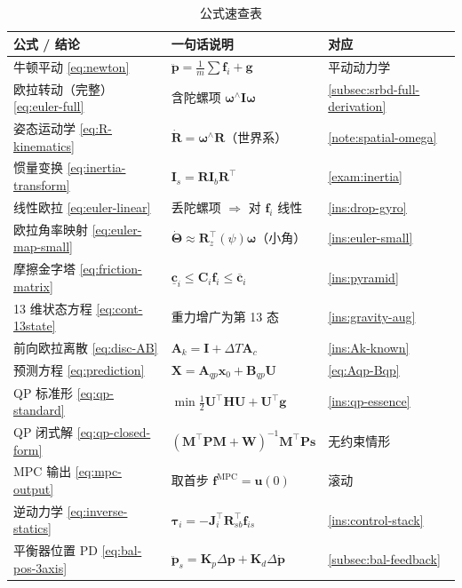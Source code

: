 \begin{table}[H]\centering\small
\caption{公式速查表}
\begin{tabular}{lll}
\toprule
公式 / 结论 & 一句话说明 & 对应 \\
\midrule
牛顿平动 \cref{eq:newton} & $\ddot{\boldsymbol{p}}=\tfrac1m\sum\mathbf{f}_i+\boldsymbol{g}$ & 平动动力学 \\
欧拉转动（完整）\cref{eq:euler-full} & 含陀螺项 $\boldsymbol{\omega}^\wedge\mathbf{I}\boldsymbol{\omega}$ & \cref{subsec:srbd-full-derivation} \\
姿态运动学 \cref{eq:R-kinematics} & $\dot{\mathbf{R}}=\boldsymbol{\omega}^\wedge\mathbf{R}$（世界系） & \cref{note:spatial-omega} \\
惯量变换 \cref{eq:inertia-transform} & $\mathbf{I}_s=\mathbf{R}\mathbf{I}_b\mathbf{R}^\top$ & \cref{exam:inertia} \\
线性欧拉 \cref{eq:euler-linear} & 丢陀螺项 $\Rightarrow$ 对 $\mathbf{f}_i$ 线性 & \cref{ins:drop-gyro} \\
欧拉角率映射 \cref{eq:euler-map-small} & $\dot{\boldsymbol{\Theta}}\approx\mathbf{R}_z^\top(\psi)\boldsymbol{\omega}$（小角） & \cref{ins:euler-small} \\
摩擦金字塔 \cref{eq:friction-matrix} & $\underline{\mathbf{c}}_i\le\mathbf{C}_i\mathbf{f}_i\le\overline{\mathbf{c}}_i$ & \cref{ins:pyramid} \\
13 维状态方程 \cref{eq:cont-13state} & 重力增广为第 13 态 & \cref{ins:gravity-aug} \\
前向欧拉离散 \cref{eq:disc-AB} & $\mathbf{A}_k=\mathbf{I}+\Delta T\mathbf{A}_c$ & \cref{ins:Ak-known} \\
预测方程 \cref{eq:prediction} & $\mathbf{X}=\mathbf{A}_{qp}\boldsymbol{x}_0+\mathbf{B}_{qp}\mathbf{U}$ & \cref{eq:Aqp-Bqp} \\
QP 标准形 \cref{eq:qp-standard} & $\min\tfrac12\mathbf{U}^\top\mathbf{H}\mathbf{U}+\mathbf{U}^\top\mathbf{g}$ & \cref{ins:qp-essence} \\
QP 闭式解 \cref{eq:qp-closed-form} & $(\mathbf{M}^\top\mathbf{P}\mathbf{M}+\mathbf{W})^{-1}\mathbf{M}^\top\mathbf{P}\mathbf{s}$ & 无约束情形 \\
MPC 输出 \cref{eq:mpc-output} & 取首步 $\mathbf{f}^{\mathrm{MPC}}=\boldsymbol{u}(0)$ & 滚动 \\
逆动力学 \cref{eq:inverse-statics} & $\boldsymbol{\tau}_i=-\mathbf{J}_i^\top\mathbf{R}_{sb}^\top\mathbf{f}_{is}$ & \cref{ins:control-stack} \\
平衡器位置 PD \cref{eq:bal-pos-3axis} & $\ddot{\boldsymbol{p}}_s=\mathbf{K}_p\Delta\boldsymbol{p}+\mathbf{K}_d\Delta\dot{\boldsymbol{p}}$ & \cref{subsec:bal-feedback} \\

\end{tabular}
\end{table}
